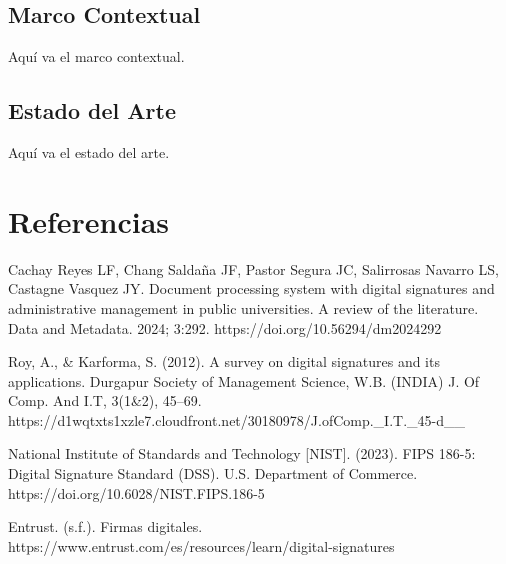 \documentclass[a4paper,12pt]{report}
\begin{document}
\section{Marco Contextual}
Aquí va el marco contextual.

\section{Estado del Arte}
Aquí va el estado del arte.

\chapter{Referencias}

Cachay Reyes LF, Chang Saldaña JF, Pastor Segura JC, Salirrosas Navarro LS, Castagne Vasquez JY. Document processing system
with digital signatures and administrative management in public universities. A review of the literature. Data and Metadata. 2024; 3:292.
https://doi.org/10.56294/dm2024292

Roy, A., & Karforma, S. (2012). A survey on digital signatures and its applications. Durgapur Society of Management Science, W.B. (INDIA) J. Of Comp. And I.T, 3(1&2), 45–69. https://d1wqtxts1xzle7.cloudfront.net/30180978/J.ofComp._I.T._45-d__%

National Institute of Standards and Technology [NIST]. (2023). FIPS 186-5: Digital Signature Standard (DSS). U.S. Department of Commerce. https://doi.org/10.6028/NIST.FIPS.186-5 


Entrust. (s.f.). Firmas digitales. https://www.entrust.com/es/resources/learn/digital-signatures
\end{document}
